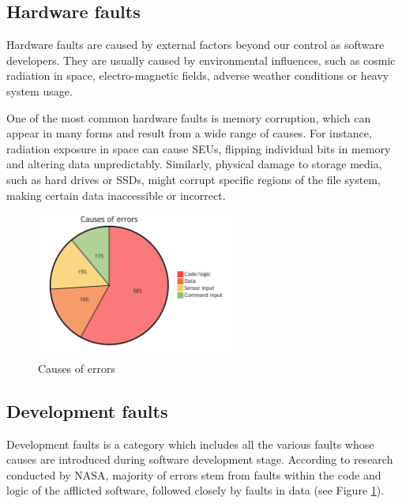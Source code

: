 \subsection{Hardware faults}

Hardware faults are caused by external factors beyond our control as software developers. They are usually caused by environmental influences, such as cosmic radiation in space, electro-magnetic fields, adverse weather conditions or heavy system usage.

One of the most common hardware faults is memory corruption, which can appear in many forms and result from a wide range of causes. For instance, radiation exposure in space can cause SEUs, flipping individual bits in memory and altering data unpredictably. Similarly, physical damage to storage media, such as hard drives or SSDs, might corrupt specific regions of the file system, making certain data inaccessible or incorrect.


\begin{figure}[!hbt]
    \centering
    \includegraphics[width=0.6\textwidth]{diagrams/stats/piechart.png}
    \caption{Causes of errors \cite{nasa:stats}}
    \label{fig:nasa_stats}
\end{figure}

\subsection{Development faults}

Development faults is a category which includes all the various faults whose causes are introduced during software development stage. According to research conducted by NASA, majority of errors stem from faults within the code and logic of the afflicted software, followed closely by faults in data \cite{nasa:stats} (see Figure \ref{fig:nasa_stats}).

